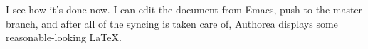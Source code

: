 I see how it's done now. I can edit the document from
Emacs, push to the master branch, and after all of the
syncing is taken care of, Authorea displays some
reasonable-looking LaTeX.